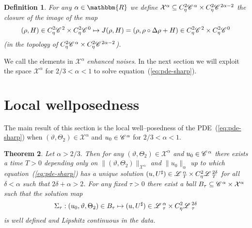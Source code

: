 \documentclass[11pt,reqno]{amsart}
\newcommand{\tmtextit}[1]{{\itshape{#1}}}
\newtheorem{theorem}{Theorem}
\newtheorem{definition}[theorem]{Definition}
\newcommand{\CC}{\mathscr{C} \hspace{.1em}}
\newcommand{\LL}{\mathscr{L} \hspace{.2em}}
\begin{document}
\begin{definition}
  For any $\alpha \in \mathbbm{R}$ we define $\mathcal{X}^{\alpha} \subseteq
  C^2_{\eta} \CC^{\alpha} \times C^2_{\eta} \CC^{2 \alpha - 2}$ the closure of
  the image of the map
  \[ (\rho, H) \in C^2_{\eta} \CC^2 \times C^2_{\eta} \CC^0 \mapsto J (\rho,
     H) = (\rho, \rho \circ \Delta \rho + H) \in C^2_{\eta} \CC^2 \times
     C^2_{\eta} \CC^0 \]
  (in the topology of $C^2_{\eta} \CC^{\alpha} \times C^2_{\eta} \CC^{2 \alpha
  - 2}$).
\end{definition}

We call the elements in $\mathcal{X}^{\alpha}$ \tmtextit{enhanced noises}. In
the next section we will exploit the space $\mathcal{X}^{\alpha}$ for $2 / 3 <
\alpha < 1$ to solve equation~(\ref{eq:pde-sharp}). \

\section{Local wellposedness\label{s:fixpoint}}

The main result of this section is the local well--posedness of the
PDE~(\ref{eq:pde-sharp}) when $(\vartheta, \Theta_2) \in \mathcal{X}^{\alpha}$
and $u_0 \in \CC^{\alpha}$ for $2 / 3 < \alpha < 1$.

\begin{theorem}
  Let $\alpha > 2 / 3.$ Then for any $(\vartheta, \Theta_2) \in
  \mathcal{X}^{\alpha}$ and $u_0 \in \CC^{\alpha}$ there exists a time $T > 0$
  depending only on $\| (\vartheta, \Theta_2) \|_{\mathcal{X}^{\alpha}}$ and
  $\| u_0 \|_{\alpha}$ up to which equation~(\ref{eq:pde-sharp}) has a unique
  solution $(u, U^{\sharp}) \in \LL^{\alpha}_T \times C_{\eta}^2 \LL^{2
  \delta}_T$ for all $\delta < \alpha$ such that $2 \delta + \alpha > 2$. For
  any fixed $\tau > 0$ there exist a ball $B_{\tau} \subseteq \CC^{\alpha}
  \times \mathcal{X}^{\alpha}$ such that the solution map
  \[ \Sigma_{\tau} : (u_0, \vartheta, \Theta_2) \in B_{\tau} \mapsto (u,
     U^{\sharp}) \in \LL^{\alpha}_{\tau} \times C_{\eta}^2 \LL^{2
     \delta}_{\tau} \]
  is well defined and Lipshitz continuous in the data. 
\end{theorem}
\end{document}
